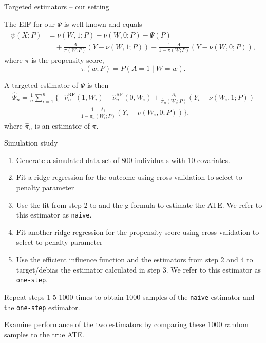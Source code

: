 \documentclass[smaller]{beamer}\usepackage{listings}
\newcommand{\1}{\mathds{1}}
\begin{document}
\begin{frame}[label={sec:orgae3adca}]{Targeted estimators -- our setting}
\small

The EIF for our \(\Psi\) is well-known
\citep[e.g.,][]{kennedy2016semiparametric,kennedy2022semiparametric,hines2022demystifying}
and equals
\begin{align*}
  \dot{\psi}(X; P)
  & = \nu(W, 1; P) - \nu(W, 0;P)
    - \Psi(P)
  \\
  & \quad
    + \frac{A}{\pi(W;P)}(Y - \nu(W, 1; P))
    - \frac{1-A}{1-\pi(W;P)}(Y - \nu(W, 0;P)),
\end{align*}
where $\pi$ is the propensity score,
\begin{equation*}
  \pi(w; P) = P(A=1 \mid W=w).
\end{equation*}

\vfill

A targeted estimator of \(\Psi\) is then
\begin{align*}
  \hat{\Psi}_n= 
  \frac{1}{n}\sum_{i=1}^{n}
  \Big\{
  &
    \hat{\nu}_n^{\text{RF}}(1, W_i) - \hat{\nu}_n^{\text{RF}}(0, W_i)
    + \frac{A_i}{\hat{\pi}_n(W_i;P)}(Y_i - \nu(W_i, 1; P))
  \\
  & \quad
    - \frac{1-A_i}{1-\hat{\pi}_n(W_i;P)}(Y_i - \nu(W_i, 0;P))
    \Big\},
\end{align*}
where $\hat{\pi}_n$ is an estimator of $\pi$.
\end{frame}



\begin{frame}[label={sec:org2f62858},fragile]{Simulation study}
 \small

\begin{enumerate}
\item Generate a simulated data set of 800 individuals with 10 covariates.
\item Fit a ridge regression for the outcome using cross-validation to select
to penalty parameter
\item Use the fit from step 2 to and the g-formula to estimate the ATE. We refer to
this estimator as \texttt{naive}.
\item Fit another ridge regression for the propensity score using cross-validation
to select to penalty parameter
\item Use the efficient influence function and the estimators from step 2 and 4 to
target/debias the estimator calculated in step 3. We refer to this estimator
as \texttt{one-step}.
\end{enumerate}


\vfill

Repeat steps 1-5 1000 times to obtain 1000 samples of the \texttt{naive} estimator and
the \texttt{one-step} estimator.

\vfill

Examine performance of the two estimators by comparing these 1000 random samples
to the true ATE.
\end{frame}
\end{document}
